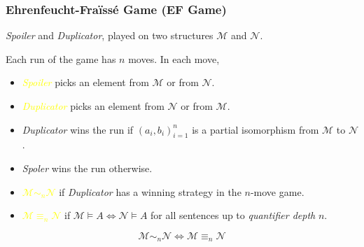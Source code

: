 \documentclass[UTF8,11pt,colorlinks,compress,openany]{beamer}%
\begin{document}
\begin{frame}\frametitle{Ehrenfeucht-Fra\"iss\'e Game (EF Game)}
\emph{Spoiler} and \emph{Duplicator}, played on two structures $\mathcal{M}$ and $\mathcal{N}$.

Each run of the game has $n$ moves. In each move,

\begin{itemize}
	\item \emph{\textcolor{yellow}{Spoiler}} picks an element from $\mathcal{M}$ or from $\mathcal{N}$.
	\item \emph{\textcolor{yellow}{Duplicator}} picks an element from $\mathcal{N}$ or from $\mathcal{M}$.
\end{itemize}
\begin{itemize}
	\item \emph{Duplicator} wins the run if $(a_i,b_i)_{i=1}^n$ is a partial isomorphism from $\mathcal{M}$ to $\mathcal{N}$.
	\item \emph{Spoler} wins the run otherwise.
\end{itemize}
\begin{itemize}
	\item \textcolor{yellow}{$\mathcal{M}\sim_n\mathcal{N}$} if \emph{Duplicator} has a winning strategy in the $n$-move game.
	\item \textcolor{yellow}{$\mathcal{M}\equiv_n\mathcal{N}$} if $\mathcal{M}\vDash A\iff\mathcal{N}\vDash A$ for all sentences up to \emph{quantifier depth} $n$.
\end{itemize}
\begin{theorem}
\[\mathcal{M}\sim_n\mathcal{N}\iff \mathcal{M}\equiv_n\mathcal{N}\]
\end{theorem}
\end{frame}
\end{document}
